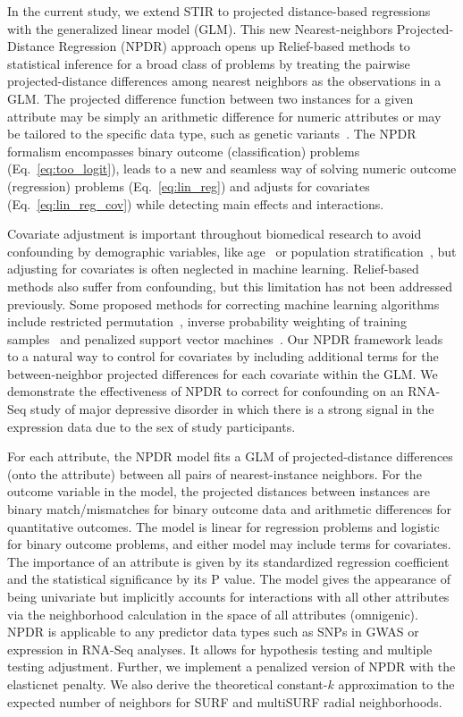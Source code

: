 \documentclass[10pt]{article}
\begin{document}
In the current study, we extend STIR to projected distance-based regressions with the generalized linear model (GLM).
This new Nearest-neighbors Projected-Distance Regression (NPDR) approach opens up Relief-based methods to statistical inference for a broad class of problems by treating the pairwise projected-distance differences among nearest neighbors as the observations in a GLM.
The projected difference function between two instances for a given attribute may be simply an arithmetic difference for numeric attributes or may be tailored to the specific data type, such as genetic variants~\cite{titv}.
The NPDR formalism encompasses binary outcome (classification) problems (Eq.~\ref{eq:too_logit}), leads to a new and seamless way of solving numeric outcome (regression) problems (Eq.~\ref{eq:lin_reg}) and adjusts for covariates (Eq.~\ref{eq:lin_reg_cov}) while detecting main effects and interactions. 

Covariate adjustment is important throughout biomedical research to avoid confounding by demographic variables, like age~\cite{le18_brainagesim} or population stratification~\cite{popstrat16}, but adjusting for covariates is often neglected in machine learning.
Relief-based methods also suffer from confounding, but this limitation has not been addressed previously. Some proposed methods for correcting machine learning algorithms include restricted permutation~\cite{rao2017}, inverse probability weighting of training samples~\cite{linn2016} and penalized support vector machines~\cite{li2011ccsvm}.
Our NPDR framework leads to a natural way to control for covariates by including additional terms for the between-neighbor projected differences for each covariate within the GLM.
We demonstrate the effectiveness of NPDR to correct for confounding on an RNA-Seq study of major depressive disorder in which there is a strong signal in the expression data due to the sex of study participants. 

For each attribute, the NPDR model fits a GLM of projected-distance differences (onto the attribute) between all pairs of nearest-instance neighbors.
For the outcome variable in the model, the projected distances between instances are binary match/mismatches for binary outcome data and arithmetic differences for quantitative outcomes.
The model is linear for regression problems and logistic for binary outcome problems, and either model may include terms for covariates.
The importance of an attribute is given by its standardized regression coefficient and the statistical significance by its P value.
The model gives the appearance of being univariate but implicitly accounts for interactions with all other attributes via the neighborhood calculation in the space of all attributes (omnigenic).
NPDR is applicable to any predictor data types such as SNPs in GWAS or expression in RNA-Seq analyses.
It allows for hypothesis testing and multiple testing adjustment.
Further, we implement a penalized version of NPDR with the elasticnet penalty.
We also derive the theoretical constant-$k$ approximation to the expected number of neighbors for SURF and multiSURF radial neighborhoods.
\end{document}
